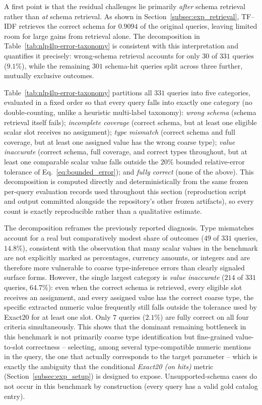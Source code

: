 \documentclass[3p]{elsarticle}
\begin{document}
A first point is that the residual challenges lie primarily \emph{after} schema retrieval rather than \emph{at} schema retrieval. As shown in Section~\ref{subsec:exp_retrieval}, TF--IDF retrieves the correct schema for $0.9094$ of the original queries, leaving limited room for large gains from retrieval alone. The decomposition in Table~\ref{tab:nlp4lp-error-taxonomy} is consistent with this interpretation and quantifies it precisely: wrong-schema retrieval accounts for only $30$ of $331$ queries ($9.1\%$), while the remaining $301$ schema-hit queries split across three further, mutually exclusive outcomes.

Table~\ref{tab:nlp4lp-error-taxonomy} partitions all $331$ queries into five categories, evaluated in a fixed order so that every query falls into exactly one category (no double-counting, unlike a heuristic multi-label taxonomy): \emph{wrong schema} (schema retrieval itself fails); \emph{incomplete coverage} (correct schema, but at least one eligible scalar slot receives no assignment); \emph{type mismatch} (correct schema and full coverage, but at least one assigned value has the wrong coarse type); \emph{value inaccurate} (correct schema, full coverage, and correct types throughout, but at least one comparable scalar value falls outside the $20\%$ bounded relative-error tolerance of Eq.~\eqref{eq:bounded_error}); and \emph{fully correct} (none of the above). This decomposition is computed directly and deterministically from the same frozen per-query evaluation records used throughout this section (reproduction script and output committed alongside the repository's other frozen artifacts), so every count is exactly reproducible rather than a qualitative estimate.

The decomposition reframes the previously reported diagnosis. Type mismatches account for a real but comparatively modest share of outcomes ($49$ of $331$ queries, $14.8\%$), consistent with the observation that many scalar values in the benchmark are not explicitly marked as percentages, currency amounts, or integers and are therefore more vulnerable to coarse type-inference errors than clearly signaled surface forms. However, the single largest category is \emph{value inaccurate} ($214$ of $331$ queries, $64.7\%$): even when the correct schema is retrieved, every eligible slot receives an assignment, and every assigned value has the correct coarse type, the specific extracted numeric value frequently still falls outside the tolerance used by Exact20 for at least one slot. Only $7$ queries ($2.1\%$) are fully correct on all four criteria simultaneously. This shows that the dominant remaining bottleneck in this benchmark is not primarily coarse type identification but fine-grained value-to-slot correctness -- selecting, among several type-compatible numeric mentions in the query, the one that actually corresponds to the target parameter -- which is exactly the ambiguity that the conditional \textit{Exact20 (on hits)} metric (Section~\ref{subsec:exp_setup}) is designed to expose. Unsupported-schema cases do not occur in this benchmark by construction (every query has a valid gold catalog entry).
\end{document}
